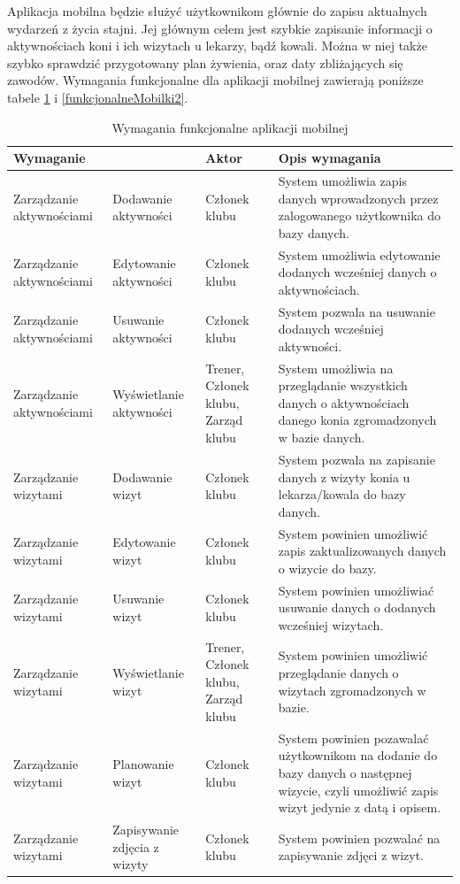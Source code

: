 \documentclass[12pt,oneside]{report}
\begin{document}
Aplikacja mobilna będzie służyć użytkownikom głównie do zapisu aktualnych wydarzeń z życia stajni. Jej głównym celem jest szybkie zapisanie informacji o aktywnościach koni i ich wizytach u lekarzy, bądź kowali. Można w niej także szybko sprawdzić przygotowany plan żywienia, oraz daty zbliżających się zawodów.
Wymagania funkcjonalne dla aplikacji mobilnej zawierają poniższe tabele \ref{funkcjonalneMobilki1} i \ref{funkcjonalneMobilki2}.
\begin{table}[H]
	\centering
	\begin{tabular}{|p{3cm}|p{3cm}|p{3cm}|p{6cm}|}			
		\hline
	   \multicolumn{2}{|l|}{Wymaganie} & Aktor & Opis wymagania\\
		\hline
		Zarządzanie aktywnościami & Dodawanie aktywności & Członek klubu &  System umożliwia zapis danych wprowadzonych przez zalogowanego użytkownika do bazy danych.\\	
		\hline	
		Zarządzanie aktywnościami & Edytowanie aktywności & Członek klubu & System umożliwia edytowanie dodanych wcześniej danych o aktywnościach. \\	
		\hline	
		Zarządzanie aktywnościami& Usuwanie aktywności & Członek klubu & System pozwala na usuwanie dodanych wcześniej aktywności. \\
		\hline
		Zarządzanie aktywnościami& Wyświetlanie aktywności & Trener, Członek klubu, Zarząd klubu& System umożliwia na przeglądanie wszystkich danych o aktywnościach danego konia zgromadzonych w bazie danych.\\
		\hline
		Zarządzanie wizytami & Dodawanie wizyt & Członek klubu& System pozwala na zapisanie danych z wizyty konia u lekarza/kowala do bazy danych.\\
		\hline
		Zarządzanie wizytami & Edytowanie wizyt & Członek klubu& System powinien umożliwić zapis zaktualizowanych danych o wizycie do bazy.\\
		\hline
		Zarządzanie wizytami & Usuwanie wizyt & Członek klubu & System powinien umożliwiać usuwanie danych o dodanych wcześniej wizytach.\\
		\hline 
		Zarządzanie wizytami & Wyświetlanie wizyt & Trener, Członek klubu, Zarząd klubu& System powinien umożliwić przeglądanie danych o wizytach zgromadzonych w bazie.\\
		\hline
		Zarządzanie wizytami & Planowanie wizyt & Członek klubu & System powinien pozawalać użytkownikom na dodanie do bazy danych o następnej wizycie, czyli umożliwić zapis wizyt jedynie z datą i opisem.\\
		\hline
		Zarządzanie wizytami & Zapisywanie zdjęcia z wizyty & Członek klubu&System powinien pozwalać na zapisywanie zdjęci z wizyt.\\
		\hline
	\end{tabular}
	\caption{Wymagania funkcjonalne aplikacji mobilnej}
	\label{funkcjonalneMobilki1}
\end{table}
\end{document}
